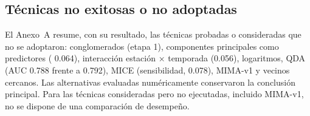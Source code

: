 \subsection{Técnicas no exitosas o no adoptadas}
El Anexo~A resume, con su resultado, las técnicas probadas o consideradas que no se adoptaron: conglomerados (etapa 1), componentes principales como predictores (\dauc{} 0.064), interacción estación × temporada (0.056), logaritmos, QDA (AUC 0.788 frente a 0.792), MICE (sensibilidad, 0.078), MIMA-v1 y vecinos cercanos. Las alternativas evaluadas numéricamente conservaron la conclusión principal. Para las técnicas consideradas pero no ejecutadas, incluido MIMA-v1, no se dispone de una comparación de desempeño.
